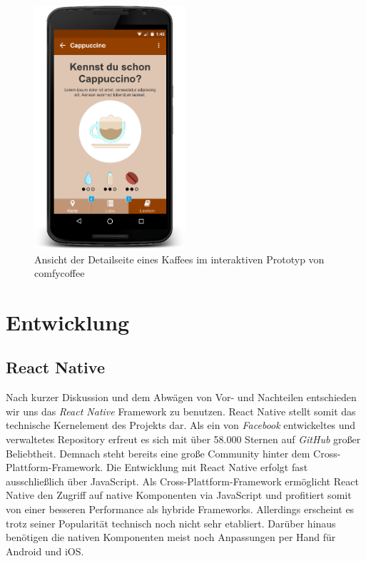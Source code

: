 \begin{figure}[H]
    \centering
		\includegraphics[width=0.5\textwidth]{Bilder/detail.png}
		\caption{Ansicht der Detailseite eines Kaffees im interaktiven Prototyp von comfycoffee}
\end{figure}

\chapter{Entwicklung}
\label{entwicklung}


\section{React Native}
\label{sec:reactnative}
Nach kurzer Diskussion und dem Abwägen von Vor- und Nachteilen entschieden wir uns das \emph{React Native} Framework zu benutzen.
React Native stellt somit das technische Kernelement des Projekts dar.
Als ein von \emph{Facebook} entwickeltes und verwaltetes Repository erfreut es sich mit über 58.000 Sternen auf \emph{GitHub} großer Beliebtheit.
Demnach steht bereits eine große Community hinter dem Cross-Plattform-Framework.
Die Entwicklung mit React Native erfolgt fast ausschließlich über JavaScript.
Als Cross-Plattform-Framework ermöglicht React Native den Zugriff auf native Komponenten via JavaScript und profitiert somit von einer besseren Performance als hybride Frameworks.
Allerdings erscheint es trotz seiner Popularität technisch noch nicht sehr etabliert.
Darüber hinaus benötigen die nativen Komponenten meist noch Anpassungen per Hand für Android und iOS.


